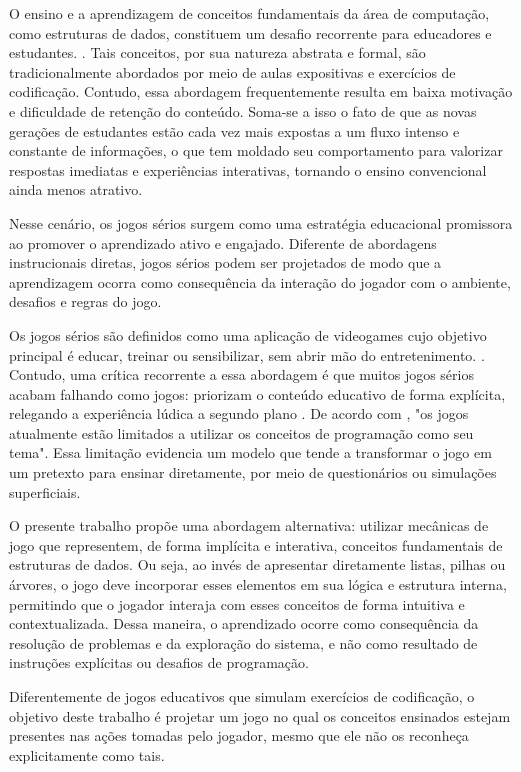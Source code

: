 O ensino e a aprendizagem de conceitos fundamentais da área de computação, como estruturas de dados, constituem um desafio recorrente para educadores e estudantes. . Tais conceitos, por sua natureza abstrata e formal, são tradicionalmente abordados por meio de aulas expositivas e exercícios de codificação. Contudo, essa abordagem frequentemente resulta em baixa motivação e dificuldade de retenção do conteúdo. Soma-se a isso o fato de que as novas gerações de estudantes estão cada vez mais expostas a um fluxo intenso e constante de informações, o que tem moldado seu comportamento para valorizar respostas imediatas e experiências interativas, tornando o ensino convencional ainda menos atrativo.

Nesse cenário, os jogos sérios surgem como uma estratégia educacional promissora ao promover o aprendizado ativo e engajado. Diferente de abordagens instrucionais diretas, jogos sérios podem ser projetados de modo que a aprendizagem ocorra como consequência da interação do jogador com o ambiente, desafios e regras do jogo. 

Os jogos sérios são definidos como uma aplicação de videogames cujo objetivo principal é educar, treinar ou sensibilizar, sem abrir mão do entretenimento. \cite{mouaheb2012serious}. Contudo, uma crítica recorrente a essa abordagem é que muitos jogos sérios acabam falhando como jogos: priorizam o conteúdo educativo de forma explícita, relegando a experiência lúdica a segundo plano . De acordo com \cite{de2025codebo}, "os jogos atualmente estão limitados a utilizar os conceitos de programação como seu tema". Essa limitação evidencia um modelo que tende a transformar o jogo em um pretexto para ensinar diretamente, por meio de questionários ou simulações superficiais.

O presente trabalho propõe uma abordagem alternativa: utilizar mecânicas de jogo que representem, de forma implícita e interativa, conceitos fundamentais de estruturas de dados. Ou seja, ao invés de apresentar diretamente listas, pilhas ou árvores, o jogo deve incorporar esses elementos em sua lógica e estrutura interna, permitindo que o jogador interaja com esses conceitos de forma intuitiva e contextualizada. Dessa maneira, o aprendizado ocorre como consequência da resolução de problemas e da exploração do sistema, e não como resultado de instruções explícitas ou desafios de programação.

Diferentemente de jogos educativos que simulam exercícios de codificação, o objetivo deste trabalho é projetar um jogo no qual os conceitos ensinados estejam presentes nas ações tomadas pelo jogador, mesmo que ele não os reconheça explicitamente como tais.

